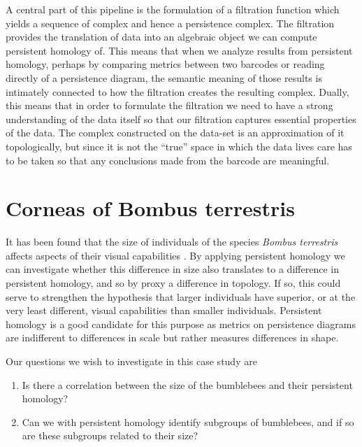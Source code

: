 A central part of this pipeline is the formulation of a filtration function which yields a sequence of complex and hence a persistence complex. The filtration provides the translation of data into an algebraic object we can compute persistent homology of. This means that when we analyze results from persistent homology, perhaps by comparing metrics between two barcodes or reading directly of a persistence diagram, the semantic meaning of those results is intimately connected to how the filtration creates the resulting complex. Dually, this means that in order to formulate the filtration we need to have a strong understanding of the data itself so that our filtration captures essential properties of the data. The complex constructed on the data-set is an approximation of it topologically, but since it is not the ``true'' space in which the data lives care has to be taken so that any conclusions made from the barcode are meaningful.


\section{Corneas of Bombus terrestris}
It has been found that the size of individuals of the species \textit{Bombus terrestris} affects aspects of their visual capabilities \cite{emily}. By applying persistent homology we can investigate whether this difference in size also translates to a difference in persistent homology, and so by proxy a difference in topology. If so, this could serve to strengthen the hypothesis that larger individuals have superior, or at the very least different, visual capabilities than smaller individuals. Persistent homology is a good candidate for this purpose as metrics on persistence diagrams are indifferent to differences in scale but rather measures differences in shape.

Our questions we wish to investigate in this case study are
\begin{enumerate}
  \item Is there a correlation between the size of the bumblebees and their persistent homology?
  \item Can we with persistent homology identify subgroups of bumblebees, and if so are these subgroups related to their size?

\end{enumerate}
